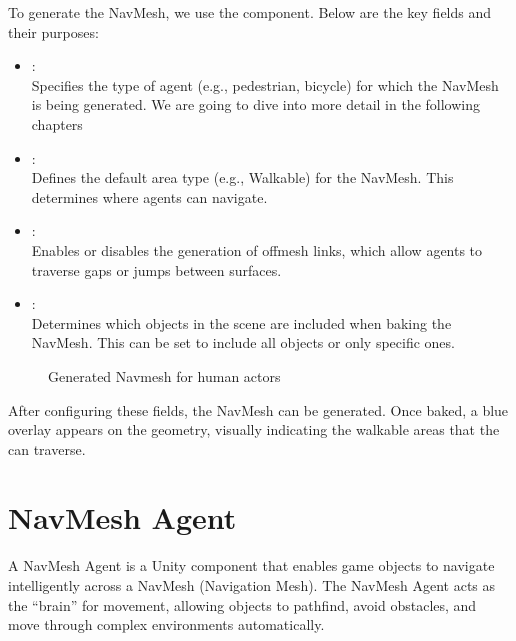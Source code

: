 \documentclass[letterpaper,10pt,english]{jupyterBook}
\begin{document}
\sphinxAtStartPar
To generate the NavMesh, we use the  component. Below are the key fields and their purposes:
\begin{itemize}
\item {} 
\sphinxAtStartPar
{}:\\
Specifies the type of agent (e.g., pedestrian, bicycle) for which the NavMesh is being generated. We are going to dive into more detail in the following chapters

\item {} 
\sphinxAtStartPar
{}:\\
Defines the default area type (e.g., Walkable) for the NavMesh. This determines where agents can navigate.

\item {} 
\sphinxAtStartPar
{}:\\
Enables or disables the generation of off\sphinxhyphen{}mesh links, which allow agents to traverse gaps or jumps between surfaces.

\item {} 
\sphinxAtStartPar
{}:\\
Determines which objects in the scene are included when baking the NavMesh. This can be set to include all objects or only specific ones.

\end{itemize}

\begin{figure}[htbp]
\centering
\capstart

\noindent{}
\caption{Generated Navmesh for human actors}\label{\detokenize{Navmesh:id1}}\end{figure}

\sphinxAtStartPar
After configuring these fields, the NavMesh can be generated. Once baked, a blue overlay appears on the geometry, visually indicating the walkable areas that the  can traverse.

\sphinxstepscope


\chapter{NavMesh Agent}
\label{\detokenize{Navmesh Agent:navmesh-agent}}\label{\detokenize{Navmesh Agent::doc}}
\sphinxAtStartPar
A NavMesh Agent is a Unity component that enables game objects to navigate intelligently across a NavMesh (Navigation Mesh). The NavMesh Agent acts as the “brain” for movement, allowing objects to pathfind, avoid obstacles, and move through complex environments automatically.
\end{document}
